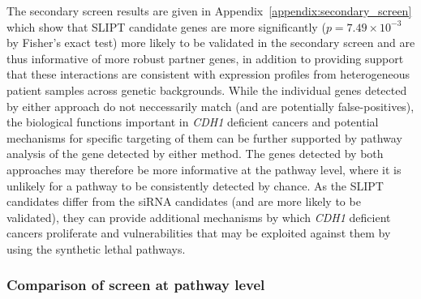 The secondary screen results are given in Appendix~\ref{appendix:secondary_screen} which show that \gls{SLIPT} candidate genes are more significantly ($p=7.49 \times 10^{-3}$ by Fisher's exact test) more  likely to be validated in the secondary screen and are thus informative of more robust partner genes, in addition to providing support that these interactions are consistent with expression profiles from heterogeneous patient samples across genetic backgrounds. While the individual genes detected by either approach do not neccessarily match (and are potentially false-positives), the biological functions important in \textit{CDH1} deficient cancers and potential mechanisms for specific targeting of them can be further supported by pathway analysis of the gene detected by either method. The genes detected by both approaches may therefore be more informative at the pathway level, where it is unlikely for a pathway to be consistently detected by chance. As the \gls{SLIPT} candidates differ from the siRNA candidates (and are more likely to be validated), they can provide additional mechanisms by which \textit{CDH1} deficient cancers proliferate and vulnerabilities that may be exploited against them by using the synthetic lethal pathways.

\FloatBarrier

\subsubsection{Comparison of screen at pathway level}  \label{chapt3:compare_pathway}

